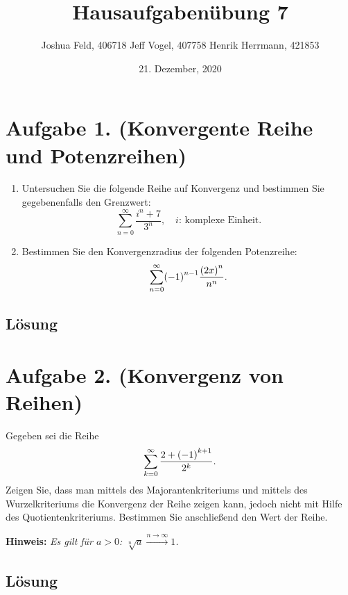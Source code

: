 \documentclass[german,12pt]{homework}
\title{Hausaufgabenübung 7}
\author{Joshua Feld, 406718 \quad Jeff Vogel, 407758 \quad Henrik Herrmann, 421853}
\date{21. Dezember, 2020}
\institute{RWTH Aachen University\\Center for Computational Engineering Science}
\DeclarePairedDelimiter{\enbrace}{(}{)}
\begin{document}
    \maketitle

    \section*{Aufgabe 1. (Konvergente Reihe und Potenzreihen)}

    \begin{problem}
        \begin{enumerate}
            \item Untersuchen Sie die folgende Reihe auf Konvergenz und
            bestimmen Sie gegebenenfalls den Grenzwert:
            \[\sum_{n = 0}^\infty\frac{i^n + 7}{3^n}, \quad i\text{: komplexe
            Einheit}.\]
            \item Bestimmen Sie den Konvergenzradius der folgenden Potenzreihe:
            \[\sum_{n = 0}^\infty\enbrace*{-1}^{n - 1}\frac{\enbrace*{2x}^n}
            {n^n}.\]
        \end{enumerate}
    \end{problem}

    \subsection*{Lösung}

    \section*{Aufgabe 2. (Konvergenz von Reihen)}

    \begin{problem}
        Gegeben sei die Reihe
        \[\sum_{k = 0}^\infty\frac{2 + \enbrace*{-1}^{k + 1}}{2^k}.\]
        Zeigen Sie, dass man mittels des Majorantenkriteriums und mittels des
        Wurzelkriteriums die Konvergenz der Reihe zeigen kann, jedoch nicht mit
        Hilfe des Quotientenkriteriums. Bestimmen Sie anschließend den Wert der
        Reihe.

        \textbf{Hinweis:} \quad \emph{Es gilt für \(a > 0\): \(\sqrt[n]{a}
        \xrightarrow{n \to \infty} 1\).}
    \end{problem}

    \subsection*{Lösung}
\end{document}
